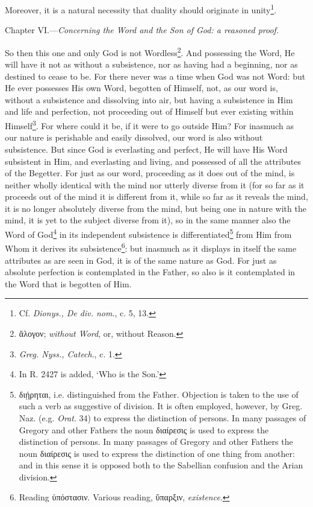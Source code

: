 Moreover, it is a natural necessity that duality should originate in unity\footnote{Cf. \emph{Dionys., De div. nom}., c. 5, 13.}.


Chapter VI.—\emph{Concerning the Word and the Son of God: a reasoned proof.}

So then this one and only God is not Wordless\footnote{\textgreek{ἄλογον}; \emph{without Word}, or, without Reason.}. And possessing the Word, He will have it not as without a subsistence, nor as having had a beginning, nor as destined to cease to be. For there never was a time when God was not Word: but He ever possesses His own Word, begotten of Himself, not, as our word is, without a subsistence and dissolving into air, but having a subsistence in Him and life and perfection, not proceeding out of Himself but ever existing within Himself\footnote{\emph{Greg. Nyss., Catech}., c. 1.}. For where could it be, if it were to go outside Him? For inasmuch as our nature is perishable and easily dissolved, our word is also without subsistence. But since God is everlasting and perfect, He will have His Word subsistent in Him, and everlasting and living, and possessed of all the attributes of the Begetter. For just as our word, proceeding as it does out of the mind, is neither wholly identical with the mind nor utterly diverse from it (for so far as it proceeds out of the mind it is different from it, while so far as it reveals the mind, it is no longer absolutely diverse from the mind, but being one in nature with the mind, it is yet to the subject diverse from it), so in the same manner also the Word of God\footnote{In R. 2427 is added, ‘Who is the Son.’} in its independent subsistence is differentiated\footnote{\textgreek{διῄρηται}, i.e. distinguished from the Father. Objection is taken to the use of such a verb as suggestive of division. It is often employed, however, by Greg. Naz. (e.g. \emph{Orat}. 34) to express the distinction of persons. In many passages of Gregory and other Fathers the noun \textgreek{διαίρεσις} is used to express the distinction of persons. In many passages of Gregory and other Fathers the noun \textgreek{διαίρεσις} is used to express the distinction of one thing from another: and in this sense it is opposed both to the Sabellian confusion and the Arian division.} from Him from Whom it derives its subsistence\footnote{Reading \textgreek{ὑπόστασιν}. Various reading, \textgreek{ὕπαρξιν}, \emph{existence}.}: but inasmuch as it displays in itself the same attributes as are seen in God, it is of the same nature as God. For just as absolute perfection is contemplated in the Father, so also is it contemplated in the Word that is begotten of Him.

